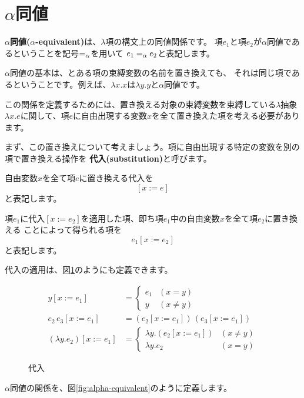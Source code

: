 \section{$\alpha$同値}

\textbf{$\alpha$同値($\alpha$-equivalent)}は、$\lambda$項の構文上の同値関係です。
項$e_1$と項$e_2$が$\alpha$同値であるということを記号$=_\alpha$を用いて
$e_1 =_\alpha e_2$と表記します。

$\alpha$同値の基本は、とある項の束縛変数の名前を置き換えても、
それは同じ項であるということです。例えば、$\lambda x . x$は$\lambda y . y$と$\alpha$同値です。

この関係を定義するためには、置き換える対象の束縛変数を束縛している$\lambda$抽象
$\lambda x . e$に関して、項$e$に自由出現する変数$x$を全て置き換えた項を考える必要があります。

まず、この置き換えについて考えましょう。項に自由出現する特定の変数を別の項で置き換える操作を
\textbf{代入(substitution)}と呼びます。

自由変数$x$を全て項$e$に置き換える代入を
\[
  [x := e]
\]
と表記します。

項$e_1$に代入$[x := e_2]$を適用した項、即ち項$e_1$中の自由変数$x$を全て項$e_2$に置き換える
ことによって得られる項を
\[
  e_1 [x := e_2]
\]
と表記します。

代入の適用は、図\ref{fig:lambda-substitute}のようにも定義できます。

\begin{figure}[htbp]
  \begin{align*}
    y [x := e_1] & = \left \{
      \begin{array}{ll}
        e_1 & (x = y) \\
        y & (x \neq y)
      \end{array}
      \right. \\
    e_2 \, e_3 [x := e_1] & = (e_2 [x := e_1]) \, (e_3 [x := e_1]) \\
    (\lambda y . e_2) [x := e_1] & = \left \{
      \begin{array}{ll}
        \lambda y . (e_2 [x := e_1]) & (x \neq y) \\
        \lambda y . e_2 & (x = y)
      \end{array}
      \right.
  \end{align*}
  \caption{代入}
  \label{fig:lambda-substitute}
\end{figure}

$\alpha$同値の関係を、図\ref{fig:alpha-equivalent}のように定義します。

